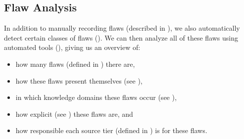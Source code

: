 \subsection{Flaw Analysis}\label{flaw-analysis}

In addition to manually recording flaws (described in ), we
also automatically detect certain classes of flaws ().
We can then analyze all of these flaws using automated tools
(), giving us an overview of:
\begin{itemize}
    \item how many flaws (defined in ) there are,
    \item how these flaws present themselves (see ),
    \item in which knowledge domains these flaws occur (see ),
    \item how explicit (see ) these flaws are, and
    \item how responsible each source tier (defined in ) is
          for these flaws.
\end{itemize}

